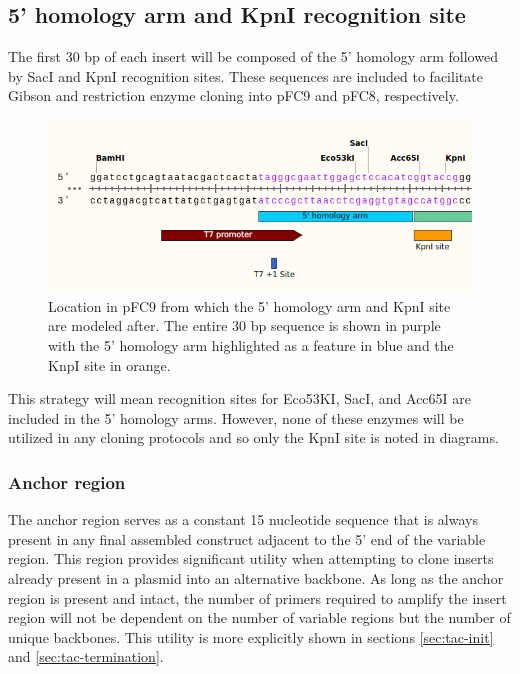 \documentclass[11pt]{article}
\begin{document}
\subsection{5' homology arm and KpnI recognition site}

The first 30 bp of each insert will be composed of the 5' homology arm followed by SacI and KpnI recognition sites. These sequences are included to facilitate Gibson and restriction enzyme cloning into pFC9 and pFC8, respectively.

\begin{figure}[h]
	\includegraphics[width=12cm]{images/variable_region/5_homology_arm.png}
	\centering
	\caption{Location in pFC9 from which the 5' homology arm and KpnI site are modeled after. The entire 30 bp sequence is shown in purple with the 5' homology arm highlighted as a feature in blue and the KnpI site in orange.}
	\label{fig:homology_5}
\end{figure}

This strategy will mean recognition sites for Eco53KI, SacI, and Acc65I are included in the 5' homology arms. However, none of these enzymes will be utilized in any cloning protocols and so only the KpnI site is noted in diagrams.


\subsubsection{Anchor region}

The anchor region serves as a constant 15 nucleotide sequence that is always present in any final assembled construct adjacent to the 5' end of the variable region. This region provides significant utility when attempting to clone inserts already present in a plasmid into an alternative backbone. As long as the anchor region is present and intact, the number of primers required to amplify the insert region will not be dependent on the number of variable regions but the number of unique backbones. This utility is more explicitly shown in sections \ref{sec:tac-init} and \ref{sec:tac-termination}. 
\end{document}
